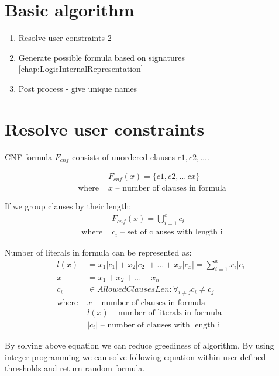 \section{Basic algorithm}

\begin{enumerate}
  \item Resolve user constraints \ref{sec:ResolveUserConstrains}
  \item Generate possible formula based on signatures \ref{chap:LogicInternalRepresentation}
  \item Post process - give unique names
\end{enumerate}

\section{Resolve user constraints}
\label{sec:ResolveUserConstrains}

CNF formula $F_{cnf}$ consists of unordered clauses $c1, c2, \dots$. 

\begin{align*}
	&F_{cnf}(x) = \{c1, c2, \dots\, cx\} \\
	\text{where }
		&x \text{ -- number of clauses in formula}
\end{align*}

If we group clauses by their length:
\begin{align*}
	&F_{cnf}(x) = \bigcup_{i=1}^c c_i \\
	\text{where }
		&c_i \text{ -- set of clauses with length i} 
\end{align*}

Number of literals in formula can be represented as:
\begin{align*}
	l(x) &= x_1|c_1| + x_2|c_2| + \dots + x_x|c_x| = \sum_{i=1}^{x} x_i |c_i| \\
	x &= x_1 + x_2 + \dots + x_n \\
	c_i &\in AllowedClausesLen: \forall_{i \neq j} c_i \neq c_j  \\
	\text{where }
		&x \text{ -- number of clauses in formula} \\ 
		&l(x) \text{ -- number of literals in formula} \\ 
		&|c_i| \text{ -- number of clauses with length i} 
\end{align*}

By solving above equation we can reduce greediness of algorithm. By using integer programming we can solve following equation within user defined thresholds and return random formula.


